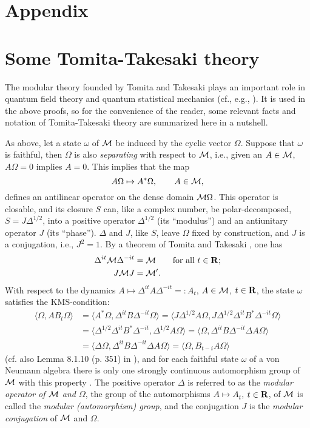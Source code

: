 \documentclass[a4paper,11pt]{article}
\renewcommand{\forall}{\mbox{for all}\,\,}
\def\dt{\cal}
\def\dM{{\dt M}}
\def\gO{\Omega}
\def\go{\omega}
\def\modop{\Delta^{1/2}}
\def\modopt{\Delta^{it}}
\def\modopmt{\Delta^{-it}}
\def\reals{{\bf R}}
\begin{document}
\begin{appendix}
\section*{Appendix}

\section{Some Tomita-Takesaki theory}\label{TTTheory}
The modular theory
founded by Tomita and Takesaki \cite{Tak} plays an important
role in quantum field theory and quantum statistical mechanics (cf., e.g.,
\cite{Haa92,Bor00}). It is used in the above proofs, so
for the convenience of the reader, some
relevant facts and notation of Tomita-Takesaki theory are
summarized here in a nutshell.

As above, let a state $\go$ of $\dM$ be induced by the cyclic vector
$\gO$. Suppose that $\go$ is faithful, then $\gO$ is also  {\em
separating} with respect to $\dM$, i.e., given an $A\in\dM$, $A\gO=0$
implies $A=0$. This implies that the map $$A\gO\mapsto A^*\gO,\qquad
A\in\dM,$$ defines an antilinear operator on the dense domain
$\dM\gO$. This operator is closable, and its closure $S$ can, like a
complex number, be polar-decomposed, $S=J\Delta^{1/2}$, into a
positive operator $\Delta^{1/2}$ (its ``modulus'') and an antiunitary
operator $J$ (its ``phase''). $\Delta$ and $J$, like $S$, leave $\gO$
fixed by construction, and $J$ is a conjugation, i.e., $J^2=1$. By a
theorem of Tomita and Takesaki \cite{Tak}, one has
\begin{align*}
\Delta^{it}\dM\Delta^{-it}&=\dM\qquad\forall t\in\reals;\\
J\dM J&=\dM'.
\end{align*}
With respect to
the dynamics $A\mapsto\Delta^{it}A\Delta^{-it}=:A_t$, $A\in\dM$, $t\in\reals$,
the state $\go$ satisfies the KMS-condition:
\begin{align*}
\langle\gO,AB_t\gO\rangle&=\langle A^*\gO,\Delta^{it}B\Delta^{-it}\gO\rangle
=\langle J\modop A\gO,J\modop\Delta^{it}B^*\Delta^{-it}\gO\rangle\\
&=\langle \modop\modopt B^*\modopmt,\modop A\gO\rangle
=\langle\gO,\modopt B\modopmt\Delta A\gO\rangle\\
&=\langle\Delta\gO,\modopt B\modopmt\Delta A\gO\rangle
=\langle\gO,B_{t-i}A\gO\rangle
\end{align*}
(cf. also Lemma 8.1.10 (p. 351) in \cite{LiB92}),
and for each faithful state $\go$ of a
von Neumann algebra there is only one strongly continuous
automorphism group of $\dM$ with this property \cite{Tak}.
The positive operator
$\Delta$ is referred to as the {\em modular operator of $\dM$ and $\gO$},
the group of the automorphisms $A\mapsto A_t$,
$t\in\reals$, of $\dM$ is called the {\em modular (automorphism) group}, and
the conjugation $J$ is the {\em modular conjugation} of $\dM$ and $\gO$.


\end{appendix}
\end{document}
